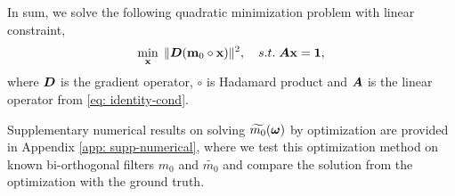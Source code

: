 In sum, we solve the following quadratic minimization problem with linear constraint,
\begin{align}\label{eq: opt}
\min_{\mathbf{x}}\; \Vert \boldsymbol{D}(\mathbf{m}_0\circ\mathbf{x})\Vert^2,\quad 
s.t. \; \boldsymbol{A}\mathbf{x} = \mathbf{1},
\end{align}
where $\boldsymbol{D}$ is the gradient operator, $\circ$ is Hadamard product and $\boldsymbol{A}$ is the linear operator from \eqref{eq: identity-cond}. 

Supplementary numerical results on solving $\widetilde{m_{0}}(\boldsymbol{\omega})$ by optimization are provided in Appendix \ref{app: supp-numerical}, where we test this optimization method on known bi-orthogonal filters $m_0$ and $\widetilde{m_0}$ and compare the solution from the optimization with the ground truth.

